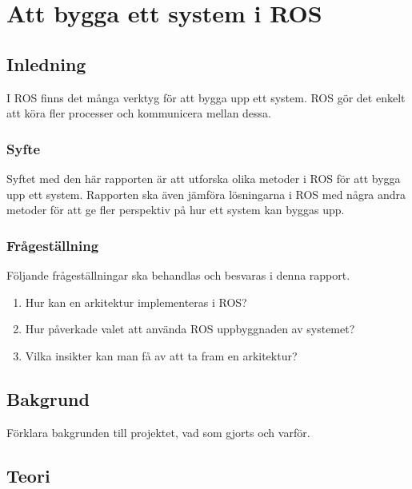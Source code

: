 \chapter{Att bygga ett system i ROS}
\label{cha:indiv-report-lundberg}

\section{Inledning}
\label{sec:introduction-lundberg}

I ROS finns det många verktyg för att bygga upp ett system. ROS gör det enkelt att köra fler processer och kommunicera mellan dessa.

\subsection{Syfte}
\label{sec:purpose-lundberg}

Syftet med den här rapporten är att utforska olika metoder i ROS för att bygga upp ett system. Rapporten ska även jämföra lösningarna i ROS med några andra metoder för att ge fler perspektiv på hur ett system kan byggas upp.

\subsection{Frågeställning}
\label{sec:issue-lundberg}

Följande frågeställningar ska behandlas och besvaras i denna rapport.

\begin{enumerate}
	\item Hur kan en arkitektur implementeras i ROS?
	
	\item Hur påverkade valet att använda ROS uppbyggnaden av systemet?
	
	\item Vilka insikter kan man få av att ta fram en arkitektur?
\end{enumerate}

\section{Bakgrund}
\label{sec:background-lundberg}

Förklara bakgrunden till projektet, vad som gjorts och varför.

\section{Teori}
\label{sec:theory-lundberg}


